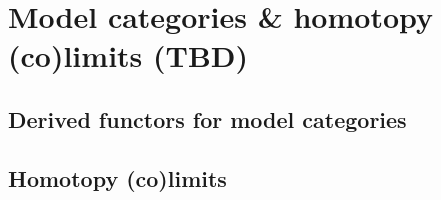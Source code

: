 
\section{Model categories \& homotopy (co)limits (TBD)}
\subsection{Derived functors for model categories}
\subsection{Homotopy (co)limits}
